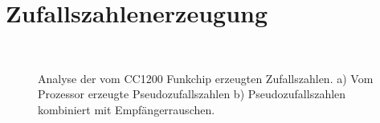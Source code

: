 \chapter{Zufallszahlenerzeugung}\label{ahg:rnd}

\begin{figure}[bth]
        \myfloatalign
         \\
        \caption[Zufallszahlen]{Analyse der vom CC1200 Funkchip erzeugten Zufallszahlen. a) Vom Prozessor erzeugte Pseudozufallszahlen b) Pseudozufallszahlen kombiniert mit Empfängerrauschen.}\label{fig:diag_scatter_rng}
\end{figure}